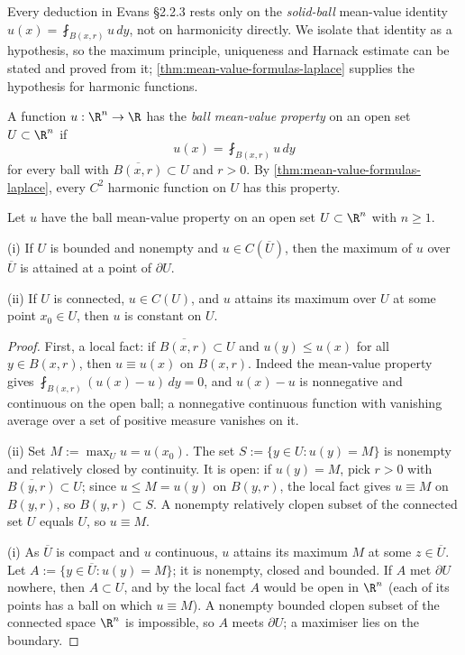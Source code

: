 Every deduction in Evans §2.2.3 rests only on the \emph{solid-ball} mean-value
identity $u(x) = \fint_{B(x,r)} u\,dy$, not on harmonicity directly. We isolate that
identity as a hypothesis, so the maximum principle, uniqueness and Harnack estimate
can be stated and proved from it; \cref{thm:mean-value-formulas-laplace} supplies the
hypothesis for harmonic functions.

\begin{definition}
\label{def:ball-mean-value-property}
\leanok
A function $u : \R^n \to \R$ has the \emph{ball mean-value property} on an open set
$U \subset \R^n$ if
$$u(x) = \fint_{B(x,r)} u \, dy$$
for every ball with $\overline{B(x,r)} \subset U$ and $r > 0$. By
\cref{thm:mean-value-formulas-laplace}, every $C^2$ harmonic function on $U$ has this
property.
\end{definition}

\begin{theorem}
\label{thm:strong-maximum-principle-mvp}
\leanok
Let $u$ have the ball mean-value property on an open set $U \subset \R^n$ with
$n \ge 1$.

(i) If $U$ is bounded and nonempty and $u \in C(\overline{U})$, then the maximum of $u$
over $\overline{U}$ is attained at a point of $\partial U$.

(ii) If $U$ is connected, $u \in C(U)$, and $u$ attains its maximum over $U$ at some
point $x_0 \in U$, then $u$ is constant on $U$.
\end{theorem}

\begin{proof}
\leanok
First, a local fact: if $\overline{B(x,r)} \subset U$ and $u(y) \le u(x)$ for all
$y \in B(x,r)$, then $u \equiv u(x)$ on $B(x,r)$. Indeed the mean-value property gives
$\fint_{B(x,r)}(u(x) - u)\,dy = 0$, and $u(x) - u$ is nonnegative and continuous on the
open ball; a nonnegative continuous function with vanishing average over a set of
positive measure vanishes on it.

(ii) Set $M := \max_U u = u(x_0)$. The set $S := \{y \in U : u(y) = M\}$ is nonempty and
relatively closed by continuity. It is open: if $u(y) = M$, pick $r > 0$ with
$\overline{B(y,r)} \subset U$; since $u \le M = u(y)$ on $B(y,r)$, the local fact gives
$u \equiv M$ on $B(y,r)$, so $B(y,r) \subset S$. A nonempty relatively clopen subset of
the connected set $U$ equals $U$, so $u \equiv M$.

(i) As $\overline{U}$ is compact and $u$ continuous, $u$ attains its maximum $M$ at some
$z \in \overline{U}$. Let $A := \{y \in \overline{U} : u(y) = M\}$; it is nonempty,
closed and bounded. If $A$ met $\partial U$ nowhere, then $A \subset U$, and by the local
fact $A$ would be open in $\R^n$ (each of its points has a ball on which $u \equiv M$).
A nonempty bounded clopen subset of the connected space $\R^n$ is impossible, so $A$
meets $\partial U$; a maximiser lies on the boundary.
\end{proof}

